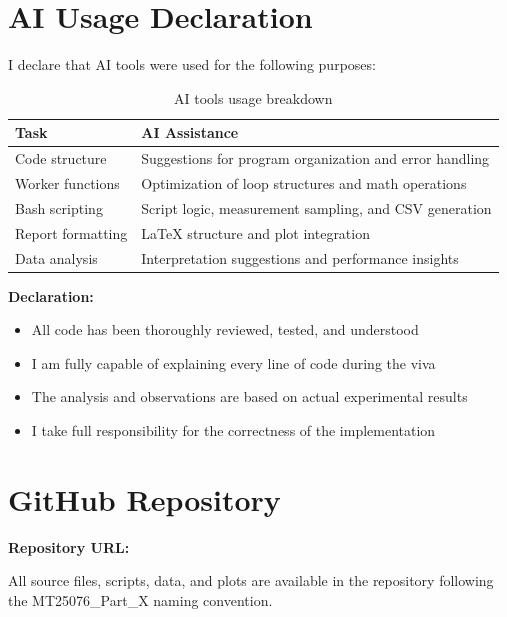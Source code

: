 \documentclass[12pt,a4paper]{article}
\begin{document}
\section{AI Usage Declaration}

I declare that AI tools were used for the following purposes:

\begin{table}[H]
\centering
\begin{tabular}{ll}
\toprule
\textbf{Task} & \textbf{AI Assistance} \\
\midrule
Code structure & Suggestions for program organization and error handling \\
Worker functions & Optimization of loop structures and math operations \\
Bash scripting & Script logic, measurement sampling, and CSV generation \\
Report formatting & LaTeX structure and plot integration \\
Data analysis & Interpretation suggestions and performance insights \\
\bottomrule
\end{tabular}
\caption{AI tools usage breakdown}
\end{table}

\textbf{Declaration:}
\begin{itemize}
    \item All code has been thoroughly reviewed, tested, and understood
    \item I am fully capable of explaining every line of code during the viva
    \item The analysis and observations are based on actual experimental results
    \item I take full responsibility for the correctness of the implementation
\end{itemize}

\section{GitHub Repository}

\noindent \textbf{Repository URL:}
\begin{center}
\end{center}

All source files, scripts, data, and plots are available in the repository following
the MT25076\_Part\_X naming convention.
\end{document}
